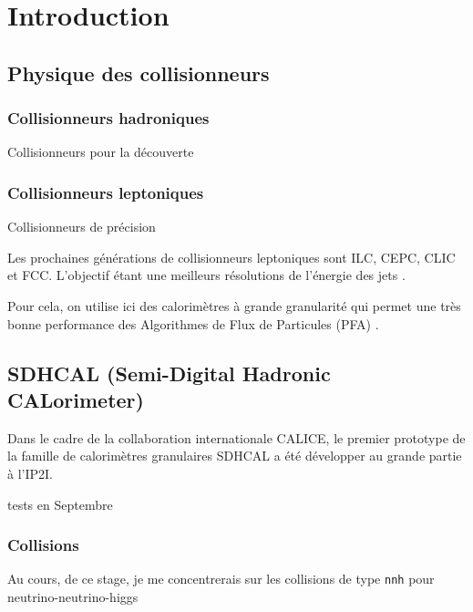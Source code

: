 \chapter{Introduction}

\section{Physique des collisionneurs}

\subsection{Collisionneurs hadroniques}

Collisionneurs pour la découverte

\subsection{Collisionneurs leptoniques}

Collisionneurs de précision

Les prochaines générations de collisionneurs leptoniques sont ILC, CEPC, CLIC et FCC. 
L'objectif étant une meilleurs résolutions de l'énergie des jets \cite{liu:tel-03405418}.

Pour cela, on utilise ici des calorimètres à grande granularité qui permet une très bonne performance des Algorithmes de Flux de Particules (PFA) \cite{liu:tel-03405418}.


\section{SDHCAL (Semi-Digital Hadronic CALorimeter)}

Dans le cadre de la collaboration internationale CALICE, le premier prototype de la famille de calorimètres granulaires SDHCAL a été développer au grande partie à l'IP2I.

tests en Septembre

\subsection{Collisions}
Au cours, de ce stage, je me concentrerais sur les collisions de type \texttt{nnh} pour neutrino-neutrino-higgs


